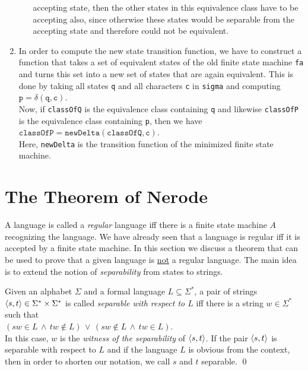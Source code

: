 \begin{enumerate}
\begin{enumerate}
            accepting state, then the other states in this equivalence class have to be
            accepting also, since otherwise these states would be separable from the
            accepting state and therefore could not be equivalent.
      \end{enumerate}
\item In order to compute the new state transition function, we have to construct a
      function that takes a set of equivalent states of the old finite state machine
      \texttt{fa} and turns this set into a new set of states that are again
      equivalent.  This is done by taking all states \texttt{q} and all characters \texttt{c} 
      in \texttt{sigma} and computing 
      \\[0.2cm]
      \hspace*{1.3cm}
      $\mathtt{p} = \delta(\mathtt{q}, \mathtt{c})$.
      \\[0.2cm]
      Now, if \texttt{classOfQ} is the equivalence class containing \texttt{q} and likewise 
      \texttt{classOfP} is the equivalence class containing \texttt{p}, then we have
      \\[0.2cm]
      \hspace*{1.3cm}
      $\texttt{classOfP} = \texttt{newDelta}(\texttt{classOfQ}, \texttt{c})$.
      \\[0.2cm]
      Here, \texttt{newDelta} is the transition function of the minimized finite state machine.
\end{enumerate}

\section{The Theorem of Nerode}
A language is called a \emph{regular} language iff there is a finite state machine $A$
recognizing the language.  We have already seen that a language is regular iff it is
accepted by a finite state machine.
In this section we discuss a theorem that can be used to prove that a given language is
\underline{not} a regular language.  The main idea is to extend the
notion of \emph{separability} from states to strings.

\begin{Definition}[separable]
  Given an alphabet $\Sigma$ and a formal language $L \subseteq \Sigma^*$, a pair of strings
  $\pair(s,t) \in \Sigma^* \times \Sigma^*$ is called 
  \emph{separable with respect to $L$} iff there is a string $w \in \Sigma^*$ 
  such that 
  \\[0.2cm]
  \hspace*{1.3cm}
  $(sw \in L \,\wedge\, tw \not\in L) \,\vee\, (sw \not\in L \,\wedge\, tw \in L)$.  
  \\[0.2cm]
  In this case, $w$ is the \emph{witness of the separability} of $\pair(s,t)$.
  If the pair $\pair(s,t)$ is separable with respect to $L$ and if the language $L$ is
  obvious from the context, then in order to shorten our notation, we call $s$ and $t$
  separable.
  \qed
\end{Definition}
\pagebreak

